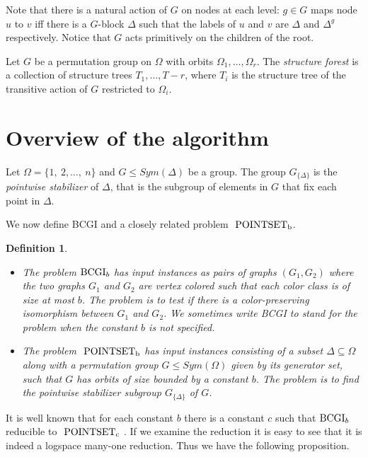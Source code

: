 \documentclass[11pt]{article}
\newtheorem{definition}[theorem]{Definition}
\newcommand{\BCGI}{\mbox{\rm BCGI}}
\newcommand{\psb}[2]{\mbox{\ensuremath{\rm{#1~}{POINTSET}_{#2}}}}
\begin{document}
Note that there is a natural action of $G$ on nodes at each level: $g
\in G$ maps node $u$ to $v$ iff there is a $G$-block $\Delta$ such
that the labels of $u$ and $v$ are $\Delta$ and $\Delta^g$
respectively. Notice that $G$ acts primitively on the children of the
root.

Let $G$ be a permutation group on $\Omega$ with orbits
$\Omega_1,\ldots,\Omega_r$. The \emph{structure forest} is a
collection of structure trees $T_1,\ldots,T-r$, where $T_i$ is the
structure tree of the transitive action of $G$ restricted to
$\Omega_i$.


\section{Overview of the algorithm}\label{section3}

Let $\Omega=\{1,~2,\ldots,~n\}$ and $G\leq Sym(\Delta)$ be a group.
The group $G_{\{\Delta\}}$ is the \emph{pointwise stabilizer} of
$\Delta$, that is the subgroup of elements in $G$ that fix each point
in $\Delta$.

We now define BCGI and a closely related problem $\psb{}{b}$.

\begin{definition}{}
\begin{itemize}
\item The problem $\BCGI_b$ has input instances as pairs of graphs
$(G_1,G_2)$ where the two graphs $G_1$ and $G_2$ are vertex colored
such that each color class is of size at most $b$. The problem is to
test if there is a color-preserving isomorphism between $G_1$ and
$G_2$. We sometimes write BCGI to stand for the problem when the
constant $b$ is not specified.

\item The problem $\psb{}{b}$ has input instances consisting of a
subset $\Delta \subseteq \Omega$ along with a permutation group $G\leq
Sym(\Omega)$ given by its generator set, such that $G$ has orbits of
size bounded by a constant $b$. The problem is to find the pointwise
stabilizer subgroup $G_{\{\Delta\}}$ of $G$.
\end{itemize}
\end{definition}

It is well known that for each constant $b$ there is a constant $c$
such that $\BCGI_b$ reducible to $\psb{}{c}$ \cite{LM,luks}. If we
examine the reduction it is easy to see that it is indeed a logspace
many-one reduction. Thus we have the following proposition.
\end{document}
